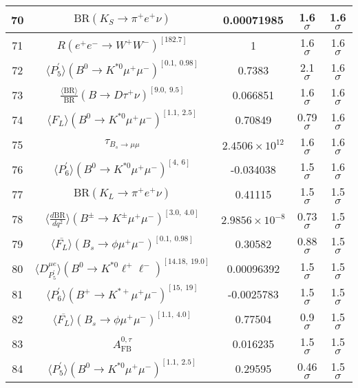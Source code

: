 \begin{longtable}{|c|c|c|c|c|}
70 &	 $\mathrm{BR}(K_S\to \pi^+e^+\nu)$ &	 0.00071985 &	 \cellcolor{red!0}1.6 $ \sigma$ &	 1.6 $ \sigma$ \\ \hline
71 &	 $R(e^+e^- \to W^+W^-)^{[182.7]}$ &	 1 &	 \cellcolor{red!0}1.6 $ \sigma$ &	 1.6 $ \sigma$ \\ \hline
72 &	 $\langle P_5^\prime\rangle(B^0\to K^{\ast 0}\mu^+\mu^-)^{[0.1,\  0.98]}$ &	 0.7383 &	 \cellcolor{red!24}2.1 $ \sigma$ &	 1.6 $ \sigma$ \\ \hline
73 &	 $\frac{\langle \mathrm{BR} \rangle}{\mathrm{BR}}(B\to D\tau^+\nu)^{[9.0,\  9.5]}$ &	 0.066851 &	 \cellcolor{green!0}1.6 $ \sigma$ &	 1.6 $ \sigma$ \\ \hline
74 &	 $\langle F_L\rangle(B^0\to K^{\ast 0}\mu^+\mu^-)^{[1.1,\  2.5]}$ &	 0.70849 &	 \cellcolor{green!39}0.79 $ \sigma$ &	 1.6 $ \sigma$ \\ \hline
75 &	 $\tau_{B_s \to \mu\mu}$ &	 $2.4506\times 10^{12}$ &	 \cellcolor{red!0}1.6 $ \sigma$ &	 1.6 $ \sigma$ \\ \hline
76 &	 $\langle P_6^\prime\rangle(B^0\to K^{\ast 0}\mu^+\mu^-)^{[4,\  6]}$ &	 -0.034038 &	 \cellcolor{green!1}1.5 $ \sigma$ &	 1.6 $ \sigma$ \\ \hline
77 &	 $\mathrm{BR}(K_L\to \pi^+e^+\nu)$ &	 0.41115 &	 \cellcolor{red!0}1.5 $ \sigma$ &	 1.5 $ \sigma$ \\ \hline
78 &	 $\langle \frac{d\mathrm{BR}}{dq^2} \rangle(B^\pm\to K^\pm \mu^+\mu^-)^{[3.0,\  4.0]}$ &	 $2.9856\times 10^{-8}$ &	 \cellcolor{green!40}0.73 $ \sigma$ &	 1.5 $ \sigma$ \\ \hline
79 &	 $\langle \overline{F_L}\rangle(B_s\to \phi \mu^+\mu^-)^{[0.1,\  0.98]}$ &	 0.30582 &	 \cellcolor{green!33}0.88 $ \sigma$ &	 1.5 $ \sigma$ \\ \hline
80 &	 $\langle D_{P_5^\prime}^{\mu e} \rangle(B^0\to K^{\ast 0}\ell^+\ell^-)^{[14.18,\  19.0]}$ &	 0.00096392 &	 \cellcolor{green!0}1.5 $ \sigma$ &	 1.5 $ \sigma$ \\ \hline
81 &	 $\langle P_6^\prime\rangle(B^+\to K^{\ast +}\mu^+\mu^-)^{[15,\  19]}$ &	 -0.0025783 &	 \cellcolor{green!0}1.5 $ \sigma$ &	 1.5 $ \sigma$ \\ \hline
82 &	 $\langle \overline{F_L}\rangle(B_s\to \phi \mu^+\mu^-)^{[1.1,\  4.0]}$ &	 0.77504 &	 \cellcolor{green!31}0.9 $ \sigma$ &	 1.5 $ \sigma$ \\ \hline
83 &	 $A_\mathrm{FB}^{0,\tau}$ &	 0.016235 &	 \cellcolor{green!0}1.5 $ \sigma$ &	 1.5 $ \sigma$ \\ \hline
84 &	 $\langle P_5^\prime\rangle(B^0\to K^{\ast 0}\mu^+\mu^-)^{[1.1,\  2.5]}$ &	 0.29595 &	 \cellcolor{green!50}0.46 $ \sigma$ &	 1.5 $ \sigma$ \\ \hline

\end{longtable}
